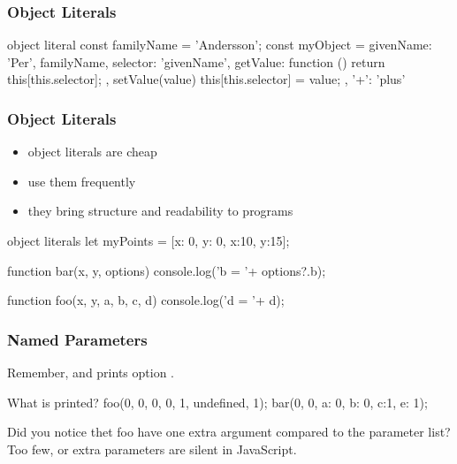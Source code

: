 \begin{frame}[fragile] \frametitle{Object Literals}
\begin{CodeBox}{object literal}
const familyName = 'Andersson';
const myObject = {
  givenName: 'Per',
  familyName,
  selector: 'givenName',
  getValue: function () {
    return this[this.selector];
  },
  setValue(value) {
    this[this.selector] = value;
  },
  '+': 'plus'
 }
\end{CodeBox}
\end{frame}

\begin{frame}[fragile] \frametitle{Object Literals}
\begin{itemize}
  \item object literals are cheap
  \item use them frequently
  \item they bring structure and readability to programs
\end{itemize}
\begin{CodeBox}{object literals}
let myPoints = [{x: 0, y: 0}, {x:10, y:15}];

function bar(x, y, options) {
 console.log('b = '+ options?.b);
}

function foo(x, y, a, b, c, d) {
 console.log('d = '+ d);
}
\end{CodeBox}
\end{frame}

\begin{frame}[fragile] \frametitle{Named Parameters}
Remember,  and  prints option .
\vspace{5mm}
\begin{CodeBox}{What is printed?}
foo(0, 0, 0, 0, 1, undefined, 1);
bar(0, 0, {a: 0, b: 0, c:1, e: 1});
\end{CodeBox}
\vspace{10mm}
Did you notice thet foo have one extra argument compared to the parameter list?
\\ Too few, or extra parameters are silent in JavaScript. 
\end{frame}

